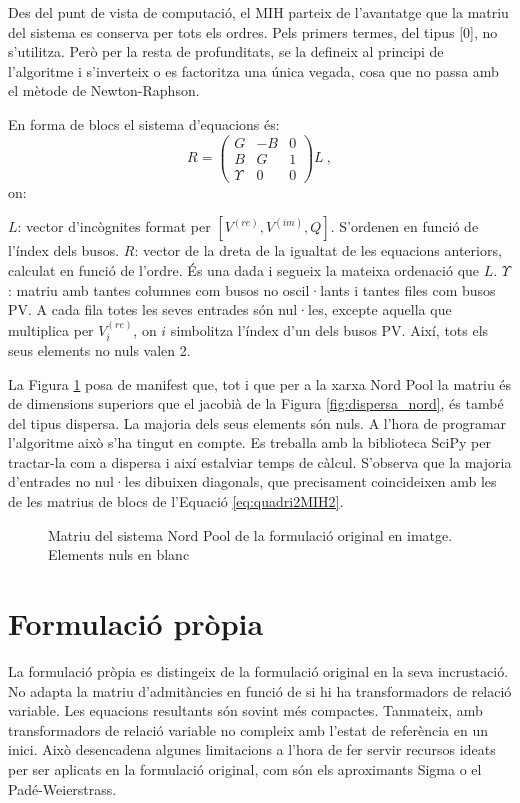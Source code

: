 Des del punt de vista de computació, el MIH parteix de l'avantatge que la matriu del sistema es conserva per tots els ordres. Pels primers termes, del tipus [0], no s'utilitza. Però per la resta de profunditats, se la defineix al principi de l'algoritme i s'inverteix o es factoritza una única vegada, cosa que no passa amb el mètode de Newton-Raphson.

En forma de blocs el sistema d'equacions és:
\begin{equation}
    R = 
    \begin{pmatrix}
        G & -B & 0 \\
        B & G &  1 \\
        \Upsilon & 0 & 0 
    \end{pmatrix}L\ ,
    \label{eq:quadri2MIH2}
\end{equation}
on:

$L$: vector d'incògnites format per $[V^{(re)}, V^{(im)}, Q]$. S'ordenen en funció de l'índex dels busos. 
\vs
$R$: vector de la dreta de la igualtat de les equacions anteriors, calculat en funció de l'ordre. És una dada i segueix la mateixa ordenació que $L$. 
\vs
$\Upsilon$: matriu amb tantes columnes com busos no oscil·lants i tantes files com busos PV. A cada fila totes les seves entrades són nul·les, excepte aquella que multiplica per $V^{(re)}_i$, on $i$ simbolitza l'índex d'un dels busos PV. Així, tots els seus elements no nuls valen 2. 

La Figura \ref{fig:dispersa_MATx} posa de manifest que, tot i que per a la xarxa Nord Pool la matriu és de dimensions superiors que el jacobià de la Figura \ref{fig:dispersa_nord}, és també del tipus dispersa. La majoria dels seus elements són nuls. A l'hora de programar l'algoritme això s'ha tingut en compte. Es treballa amb la biblioteca SciPy per tractar-la com a dispersa i així estalviar temps de càlcul. S'observa que la majoria d'entrades no nul·les dibuixen diagonals, que precisament coincideixen amb les de les matrius de blocs de l'Equació \ref{eq:quadri2MIH2}.

\begin{figure}[!ht] \footnotesize
    \begin{center}
    \caption{Matriu del sistema Nord Pool de la formulació original en imatge. Elements nuls en blanc}
    \label{fig:dispersa_MATx}
    \end{center}
\end{figure}

\section{Formulació pròpia}
La formulació pròpia es distingeix de la formulació original en la seva incrustació. No adapta la matriu d'admitàncies en funció de si hi ha transformadors de relació variable. Les equacions resultants són sovint més compactes. Tanmateix, amb transformadors de relació variable no compleix amb l'estat de referència en un inici. Això desencadena algunes limitacions a l'hora de fer servir recursos ideats per ser aplicats en la formulació original, com són els aproximants Sigma o el Padé-Weierstrass.


